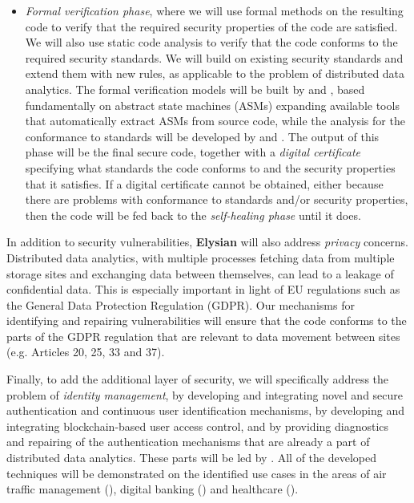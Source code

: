 \documentclass[a4paper,11pt]{article}
\newcommand{\project}[1]{\textbf{#1}\xspace}
\newcommand{\SECURITY}{\project{Elysian}}
\newcommand{\TheProject}{\SECURITY}
\begin{document}
\begin{itemize}
\item \emph{Formal verification phase}, where we will use formal methods on the resulting code to verify that the required security properties of the code are satisfied. We will also use static code analysis to verify that the code conforms to the required security standards. We will build on existing security standards 
and extend them with new rules, as applicable to the problem of distributed data analytics. The formal verification models will be built by \SCCHshort{} and \SAshort{}, based fundamentally on abstract state machines (ASMs) expanding available tools that automatically extract ASMs from source code, while the analysis for the conformance to standards will be developed by \UCMshort{} and \YAGshort{}. The output of this phase will be the final secure code, together with a \emph{digital certificate} specifying what standards the code conforms to and the security properties that it satisfies. If a digital certificate cannot be obtained, either because there are problems with conformance to standards and/or security properties, then the code will be fed back to the \emph{self-healing phase} until it does.
\end{itemize}

In addition to security vulnerabilities, \TheProject{} will also address \emph{privacy} concerns. Distributed data analytics, with multiple processes %
fetching data from multiple storage sites and exchanging data between themselves, can lead to a leakage of confidential data. This is especially important in light of EU regulations such as the General Data Protection Regulation (GDPR). Our mechanisms for identifying and repairing vulnerabilities will ensure that the %
code conforms to the parts of the GDPR regulation that are relevant to data movement between sites (e.g. Articles 20, 25, 33 and 37). 

Finally, to add the additional layer of security, we will specifically address the problem of \emph{identity management}, by developing and integrating novel and secure authentication and continuous user identification mechanisms, by developing and integrating blockchain-based user access control, and by providing diagnostics and repairing of the authentication mechanisms that are already a part of distributed data analytics. These parts will be led by \COGNIshort{}. All of the developed techniques will be demonstrated on the identified use cases in the areas of air traffic management (\FRQshort{}), digital banking (\SOPRAshort{}) and healthcare (\SOPRAshort{}). 
\end{document}

